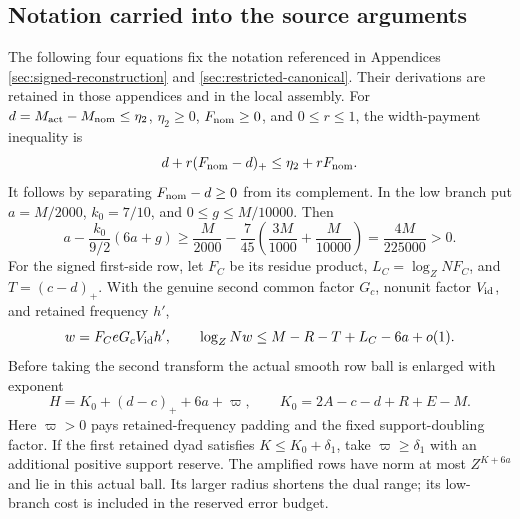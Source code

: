 \subsection{Notation carried into the source arguments}
The following four equations fix the notation referenced in Appendices
\ref{sec:signed-reconstruction} and \ref{sec:restricted-canonical}.
Their derivations are retained in those appendices and in the local assembly.
For $d=M_{\rm act}-M_{\rm nom}\le\eta_2$, $\eta_2\ge0$,
$F_{\rm nom}\ge0$, and $0\le r\le1$, the width-payment inequality is
\begin{equation}\label{eq:widthpayment}
 d+r(F_{\rm nom}-d)_{+}\le\eta_2+rF_{\rm nom}.
\end{equation}
It follows by separating $F_{\rm nom}-d\ge0$ from its complement.
In the low branch put $a=M/2000$, $k_0=7/10$, and
$0\le g\le M/10000$. Then
\begin{equation}\label{eq:lowreserve}
 a-\frac{k_0}{9/2}(6a+g)
 \ge\frac M{2000}-\frac7{45}
       \left(\frac{3M}{1000}+\frac M{10000}\right)
 =\frac{4M}{225000}>0.
\end{equation}
For the signed first-side row, let $F_C$ be its residue product,
$L_C=\log_Z NF_C$, and $T=(c-d)_+$. With the genuine second common
factor $G_c$, nonunit factor $V_{\rm id}$, and retained frequency $h'$,
\begin{equation}\label{eq:integerrow}
 w=F_CeG_cV_{\rm id}h',\qquad
 \log_Z Nw\le M-R-T+L_C-6a+o(1).
\end{equation}
Before taking the second transform the actual smooth row ball is enlarged
with exponent
\begin{equation}\label{eq:envelope}
 H=K_0+(d-c)_++6a+\varpi,\qquad K_0=2A-c-d+R+E-M.
\end{equation}
Here $\varpi>0$ pays retained-frequency padding and the fixed
support-doubling factor. If the first retained dyad satisfies
$K\le K_0+\delta_1$, take $\varpi\ge\delta_1$ with an additional
positive support reserve. The amplified rows have norm at most
$Z^{K+6a}$ and lie in this actual ball. Its larger radius shortens the
dual range; its low-branch cost is included in the reserved error budget.
